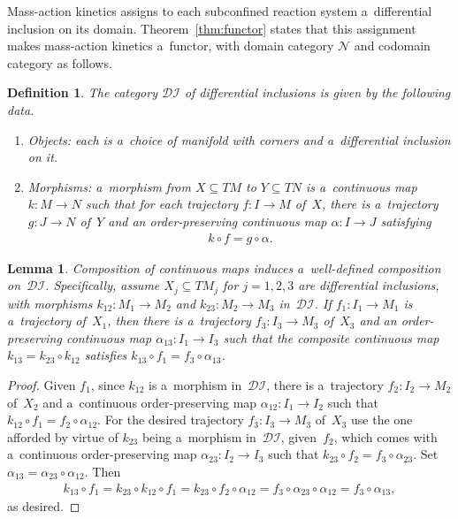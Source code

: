 \documentclass[pdftex]{sigma}
\newtheorem{Lemma}[Theorem]{Lemma}
\newtheorem{Definition}[Theorem]{Definition}
\begin{document}
Mass-action kinetics assigns to each subconf\/ined reaction system a~dif\/ferential inclusion on its domain.
Theorem~\ref{thm:functor} states that this assignment makes mass-action kinetics a~functor, with domain category
$\mathcal N$ and codomain category as follows.
\begin{Definition}
\label{d:DI}
The category $\mathcal{DI}$ of dif\/ferential inclusions is given by the following data.
\begin{enumerate}\itemsep=0pt
\item Objects: each is a~choice of manifold with corners and a~dif\/ferential inclusion on it.
\item Morphisms: a~morphism from $X\subseteq TM$ to $Y\subseteq TN$ is a~continuous map $k:M\to N$ such that for each
trajectory $f:I\to M$ of~$X$, there is a~trajectory $g:J\to N$ of~$Y$ and an order-preserving continuous map
$\alpha:I\to J$ satisfying
\begin{gather}
\label{eqn:1}
k\circ f=g\circ\alpha.
\end{gather}
\end{enumerate}
\end{Definition}
\begin{Lemma}\label{l:DI}
Composition of continuous maps induces a~well-defined composition on~$\mathcal{DI}$.
Specifically, assume $X_j\subseteq TM_j$ for $j=1,2,3$ are differential inclusions, with morphisms $k_{12}:M_1\to
M_2$ and $k_{23}:M_2\to M_3$ in~$\mathcal{DI}$.
If $f_1:I_1\to M_1$ is a~trajectory of~$X_1$, then there is a~trajectory $f_3:I_3\to M_3$ of~$X_3$ and an
order-preserving continuous map $\alpha_{13}:I_1\to I_3$ such that the composite continuous map $k_{13}=k_{23}\circ
k_{12}$ satisfies $k_{13}\circ f_1=f_3\circ\alpha_{13}$.
\end{Lemma}
\begin{proof}
Given $f_1$, since $k_{12}$ is a~morphism in~$\mathcal{DI}$, there is a~trajectory $f_2:I_2\to M_2$ of~$X_2$ and
a~continuous order-preserving map $\alpha_{12}:I_1\to I_2$ such that $k_{12}\circ f_1=f_2\circ\alpha_{12}$.
For the desired trajectory $f_3:I_3\to M_3$ of~$X_3$ use the one af\/forded by virtue of $k_{23}$ being a~morphism
in~$\mathcal{DI}$, given~$f_2$, which comes with a~continuous order-preserving map $\alpha_{23}:I_2\to I_3$ such that
$k_{23}\circ f_2=f_3\circ\alpha_{23}$.
Set $\alpha_{13}=\alpha_{23}\circ\alpha_{12}$.
Then
\begin{gather*}
k_{13}\circ f_1=k_{23}\circ k_{12}\circ f_1
=k_{23}\circ f_2\circ\alpha_{12}
=f_3\circ\alpha_{23}\circ\alpha_{12}
=f_3\circ\alpha_{13},
\end{gather*}
as desired.
\end{proof}
\end{document}

